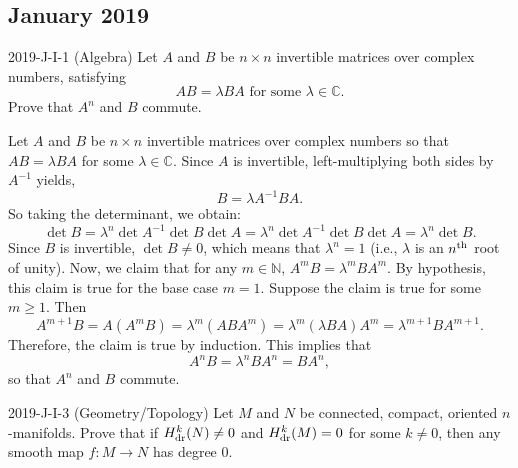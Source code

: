 \documentclass{article}
\begin{document}
\subsection{January 2019}
\begin{prb}{2019-J-I-1 (Algebra)}
	Let $A$ and $B$ be $n\times n$ invertible matrices over complex numbers, satisfying 
		\begin{equation*}
			AB = \lambda BA \text{ for some $\lambda \in \mathbb{C}$}.
		\end{equation*}
	Prove that $A^{n}$ and $B$ commute. 
\end{prb}
\begin{solutions}
	Let $A$ and $B$ be $n\times n$ invertible matrices over complex numbers so that $AB = \lambda BA$ for some $\lambda \in \mathbb{C}$. Since $A$ is invertible, left-multiplying both sides by $A^{-1}$ yields, 
		\begin{equation}
			B = \lambda A^{-1}BA. 
		\end{equation}
	So taking the determinant, we obtain: 
		\begin{equation}
			\det{B} = \lambda^{n}\det{A^{-1}}\det{B}\det{A} = \lambda^{n}\det{A}^{-1}\det{B}\det{A} = \lambda^{n}\det{B}. 
		\end{equation}
	Since $B$ is invertible, $\det{B} \neq 0$, which means that $\lambda^{n} = 1$ (i.e., $\lambda$ is an $n\textsuperscript{th}$ root of unity). Now, we claim that for any $m \in \mathbb{N}$, $A^{m}B = \lambda^{m}BA^{m}$. By hypothesis, this claim is true for the base case $m = 1$. Suppose the claim is true for some $m\geq 1$. Then 
		\begin{equation}
			A^{m + 1}B = A(A^{m}B) = \lambda^{m}(ABA^{m}) = \lambda^{m}(\lambda BA)A^{m} = \lambda^{m + 1}BA^{m + 1}. 
		\end{equation}
	Therefore, the claim is true by induction. This implies that 
		\begin{equation}
			A^{n}B = \lambda^{n}BA^{n} = BA^{n}, 
		\end{equation}
	so that $A^{n}$ and $B$ commute. 
\end{solutions}
\begin{prb}{2019-J-I-3 (Geometry/Topology)}
	Let $M$ and $N$ be connected, compact, oriented $n$-manifolds. Prove that if $H^{k}_{\text{dr}}(N) \neq 0$ and $H^{k}_{\text{dr}}(M) = 0$ for some $k \neq 0$, then any smooth map $f: M \to N$ has degree $0$.  
\end{prb}
\end{document}
